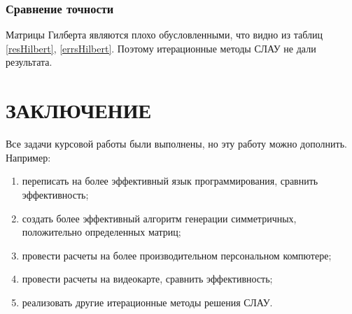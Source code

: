 \documentclass[14pt]{extarticle}
\begin{document}
\subsubsection{Сравнение точности}
Матрицы Гилберта являются плохо обусловленными, что 
видно из таблиц \ref{resHilbert}, \ref{errsHilbert}. Поэтому итерационные методы СЛАУ не дали результата.


\pagebreak
\section*{ЗАКЛЮЧЕНИЕ}
    Все задачи курсовой работы были выполнены, но эту работу можно дополнить. Например:
    \begin{enumerate}
        \item переписать на более эффективный язык программирования, сравнить эффективность;
        \item создать более эффективный алгоритм генерации симметричных, положительно определенных матриц;
        \item провести расчеты на более производительном персональном компютере;
        \item провести расчеты на видеокарте, сравнить эффективность;
        \item реализовать другие итерационные методы решения СЛАУ.
    \end{enumerate}
    \pagebreak
    \printbibliography[title=БИБЛИОГРАФИЧЕСКИЙ СПИСОК]
\end{document}
